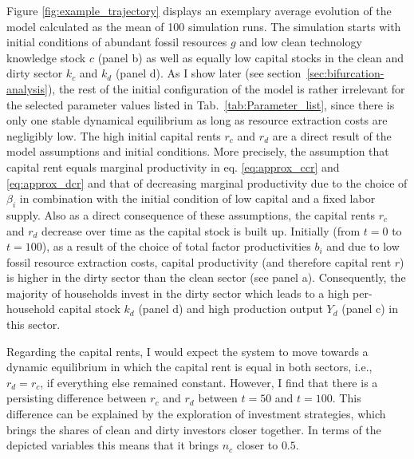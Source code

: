 Figure \ref{fig:example_trajectory} displays an exemplary average evolution of the model calculated as the mean of 100 simulation runs.
The simulation starts with initial conditions of abundant fossil resources $g$ and low clean technology knowledge stock $c$ (panel b) as well as equally low capital stocks in the clean and dirty sector $k_c$ and $k_d$ (panel d). As I show later (see section~\ref{sec:bifurcation-analysis}), the rest of the initial configuration of the model is rather irrelevant for the selected parameter values listed in Tab.~\ref{tab:Parameter_list}, since there is only one stable dynamical equilibrium as long as resource extraction costs are negligibly low.
The high initial capital rents $r_c$ and $r_d$ are a direct result of the model assumptions and initial conditions. More precisely, the assumption that capital rent equals marginal productivity in eq. \ref{eq:approx_ccr} and \ref{eq:approx_dcr} and that of decreasing marginal productivity due to the choice of $\beta_i$ in combination with the initial condition of low capital and a fixed labor supply. Also as a direct consequence of these assumptions, the capital rents $r_c$ and $r_d$ decrease over time as the capital stock is built up.
Initially (from $t=0$ to $t=100$), as a result of the choice of total factor productivities $b_i$ and due to low fossil resource extraction costs, capital productivity (and therefore capital rent $r$) is higher in the dirty sector than the clean sector (see panel a). 
Consequently, the majority of households invest in the dirty sector which leads to a high per-household capital stock $k_d$ (panel d) and high production output $Y_d$ (panel c) in this sector.

Regarding the capital rents, I would expect the system to move towards a dynamic equilibrium in which the capital rent is equal in both sectors, i.e., $r_d = r_c$, if everything else remained constant. However, I find that there is a persisting difference between $r_c$ and $r_d$ between $t=50$ and $t=100$.
This difference can be explained by the exploration of investment strategies, which brings the shares of clean and dirty investors closer together. In terms of the depicted variables this means that it brings $n_c$ closer to $0.5$. 

